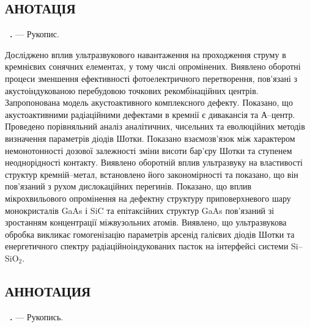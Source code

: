 \begin{center}
\section*{\MakeUppercase{анотація}}
\end{center}
\textbf{\thesisAuthorFIO~\thesisTitle.} --- Рукопис.

\abstractBegin

Досліджено вплив ультразвукового навантаження на проходження струму в кремнієвих сонячних елементах,
 у тому числі опромінених.
 Виявлено оборотні процеси зменшення ефективності фотоелектричного перетворення,
 пов'язані з акустоіндукованою перебудовою точкових рекомбінаційних центрів.
 Запропонована модель акустоактивного комплексного дефекту.
 Показано, що акустоактивними радіаційними дефектами в кремнії є дивакансія та А--центр.
 Проведено порівняльний аналіз аналітичних, чисельних та еволюційних методів визначення параметрів діодів Шотки.
 Показано взаємозв'язок між характером немонотонності дозової залежності зміни висоти бар'єру Шотки та ступенем неоднорідності контакту.
 Виявлено оборотній вплив ультразвуку на властивості структур кремній--метал, встановлено його закономірності 
 та показано, що він пов'язаний з рухом дислокаційних перегинів.
 Показано, що вплив мікрохвильового опромінення на дефектну структуру приповерхневого шару монокристалів GaAs і SiC та епітаксійних структур GaAs
 пов'язаний зі зростанням концентрації міжвузольних атомів.
 Виявлено, що ультразвукова обробка викликає гомогенізацію параметрів арсенід галієвих діодів Шотки та енергетичного спектру радіаційноіндукованих пасток  на інтерфейсі системи  Si--SiO$_2$.

\keywords


\begin{center}
{\section*{\MakeUppercase{АННОТАЦИЯ}}}
\end{center}
\textbf{\thesisAuthorFIOru~\thesisTitleRu.} --- Рукопись.

\abstractBeginRu

